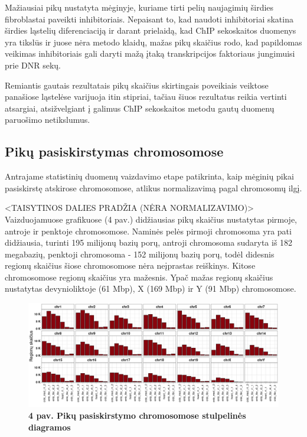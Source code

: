 \documentclass[12pt]{article}
\begin{document}
Mažiausiai pikų nustatyta mėginyje, kuriame tirti pelių naujagimių širdies
fibroblastai paveikti inhibitoriais. Nepaisant to, kad naudoti inhibitoriai
skatina širdies ląstelių diferenciaciją\cite{HEART_CELL_DIFF_ARTCL} ir darant
prielaidą, kad ChIP sekoskaitos duomenys yra tikslūs ir juose nėra
metodo klaidų, mažas pikų skaičius rodo, kad papildomas veikimas inhibitoriais
gali daryti mažą įtaką transkripcijos faktoriaus jungimuisi prie DNR sekų.

Remiantis gautais rezultatais pikų skaičius skirtingais poveikiais veiktose
panašiose ląstelėse varijuoja itin stipriai, tačiau šiuos rezultatus reikia
vertinti atsargiai, atsižvelgiant į galimus ChIP sekoskaitos metodu gautų
duomenų paruošimo netikslumus.


\subsection{Pikų pasiskirstymas chromosomose}
Antrajame statistinių duomenų vaizdavimo etape patikrinta, kaip mėginių pikai
pasiskirstę atskirose chromosomose, atlikus normalizavimą pagal chromosomų ilgį.

<TAISYTINOS DALIES PRADŽIA (NĖRA NORMALIZAVIMO)>\\
Vaizduojamuose grafikuose (4 pav.) didžiausias pikų skaičius nustatytas
pirmoje, antroje ir penktoje chromosomose. Naminės pelės pirmoji chromosoma yra
pati didžiausia, turinti 195 milijonų bazių porų, antroji chromosoma sudaryta
iš 182 megabazių, penktoji chromosoma - 152 milijonų bazių porų, todėl didesnis
regionų skaičius šiose chromosomose nėra neįprastas reiškinys. Kitose
chromosomose regionų skaičius yra mažesnis. Ypač mažas regionų skaičius
nustatytas devynioliktoje (61 Mbp), X (169 Mbp) ir Y (91 Mbp) chromosomose.

\begin{figure}[htb]
    \begin{center}
        \includegraphics[width=1\linewidth]{../Figures/peak_counts_by_chr.png}
        \vspace{-2\baselineskip}
        \caption*{\small\textbf{4 pav. Pikų pasiskirstymo chromosomose
                  stulpelinės diagramos}}
    \end{center}
\end{figure}
\end{document}
